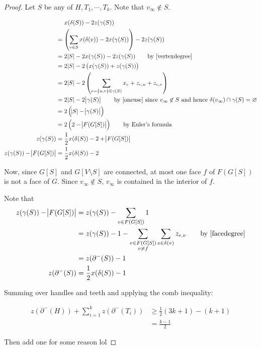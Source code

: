 \documentclass{memoir}
\begin{document}
\begin{proof}
Let $S$ be any of $H, T_1,\cdots, T_k$. Note that $v_\infty\not\in S$.

\begin{align*}
&\phantom{{}={}} x(\delta(S)) - 2z(\gamma(S)) \\ 
&= \del{\sum_{v\in S} x(\delta(v)) - 2x(\gamma(S))} - 2z(\gamma(S))\\
&= 2\abs{S} - 2x(\gamma(S)) - 2z(\gamma(S)) \tag*{by \eqref{vertexdegree}} \\
&= 2\abs{S} - 2\del{x(\gamma(S)) + z(\gamma(S))} \\
&= 2\abs{S} - 2\del{\sum_{e = \cbr{u,v}\in \gamma(S)} x_e + z_{e,u} + z_{e,v} } \\
&= 2\abs{S} - 2\abs{\gamma(S)} \tag*{by \eqref{oneuse} since $v_\infty\not\in S$ and hence $\delta(v_\infty)\cap \gamma(S) = \varnothing$} \\
&= 2\del{\abs{S}-\abs{\gamma(S)}} \\
&= 2\del{2 - \abs{F(G[S])}} \tag*{by Euler's formula} \\ 
z(\gamma(S)) &= \frac{1}{2}x(\delta(S)) - 2 + \abs{F(G[S])} \\
z(\gamma(S)) - \abs{F(G[S])} &= \frac{1}{2}x(\delta(S)) - 2
\end{align*}

Now, since $G[S]$ and $G[V\setminus S]$ are connected, at most one face $f$ of $F(G[S])$ is not a face of $G$. Since $v_\infty\not\in S$, $v_\infty$ is contained in the interior of $f$.

Note that
\begin{align*}
z(\gamma(S)) - \abs{F(G[S])} &= z(\gamma(S)) - \sum_{v \in F(G[S])} 1 \\
&= z(\gamma(S)) - 1 - \sum_{\substack{v \in F(G[S]) \\ v\neq f}} \sum_{e\in\delta(v)} z_{e,v} \tag*{by \eqref{facedegree}} \\
&= z(\partial^-(S)) - 1 \\
z(\partial^-(S)) &= \frac{1}{2}x(\delta(S)) - 1
\end{align*}

Summing over handles and teeth and applying the comb inequality:

\begin{align*}
z(\partial^-(H)) + \sum_{i=1}^k z(\partial^-(T_i)) &\geq \frac{1}{2}(3k+1) - (k+1) \\
&= \frac{k-1}{2}
\end{align*}

Then add one for some reason lol
\end{proof}
\end{document}

